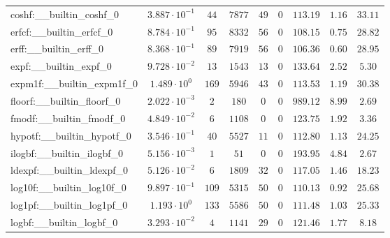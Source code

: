 \begin{tabular}{|l|c|c|c|c|c|c|c|c|}
coshf:\_\_builtin\_coshf\_0               & $ 3.887 \cdot 10^{-1} $ & $ 44     $ & $ 7877   $ & $ 49   $ & $ 0   $ & $ 113.19      $ & $ 1.16    $ & $ 33.11   $ \\
erfcf:\_\_builtin\_erfcf\_0               & $ 8.784 \cdot 10^{-1} $ & $ 95     $ & $ 8332   $ & $ 56   $ & $ 0   $ & $ 108.15      $ & $ 0.75    $ & $ 28.82   $ \\
erff:\_\_builtin\_erff\_0                 & $ 8.368 \cdot 10^{-1} $ & $ 89     $ & $ 7919   $ & $ 56   $ & $ 0   $ & $ 106.36      $ & $ 0.60    $ & $ 28.95   $ \\
expf:\_\_builtin\_expf\_0                 & $ 9.728 \cdot 10^{-2} $ & $ 13     $ & $ 1543   $ & $ 13   $ & $ 0   $ & $ 133.64      $ & $ 2.52    $ & $ 5.30    $ \\
expm1f:\_\_builtin\_expm1f\_0             & $ 1.489 \cdot 10^{0}  $ & $ 169    $ & $ 5946   $ & $ 43   $ & $ 0   $ & $ 113.53      $ & $ 1.19    $ & $ 30.38   $ \\
floorf:\_\_builtin\_floorf\_0             & $ 2.022 \cdot 10^{-3} $ & $ 2      $ & $ 180    $ & $ 0    $ & $ 0   $ & $ 989.12      $ & $ 8.99    $ & $ 2.69    $ \\
fmodf:\_\_builtin\_fmodf\_0               & $ 4.849 \cdot 10^{-2} $ & $ 6      $ & $ 1108   $ & $ 0    $ & $ 0   $ & $ 123.75      $ & $ 1.92    $ & $ 3.36    $ \\
hypotf:\_\_builtin\_hypotf\_0             & $ 3.546 \cdot 10^{-1} $ & $ 40     $ & $ 5527   $ & $ 11   $ & $ 0   $ & $ 112.80      $ & $ 1.13    $ & $ 24.25   $ \\
ilogbf:\_\_builtin\_ilogbf\_0             & $ 5.156 \cdot 10^{-3} $ & $ 1      $ & $ 51     $ & $ 0    $ & $ 0   $ & $ 193.95      $ & $ 4.84    $ & $ 2.67    $ \\
ldexpf:\_\_builtin\_ldexpf\_0             & $ 5.126 \cdot 10^{-2} $ & $ 6      $ & $ 1809   $ & $ 32   $ & $ 0   $ & $ 117.05      $ & $ 1.46    $ & $ 18.23   $ \\
log10f:\_\_builtin\_log10f\_0             & $ 9.897 \cdot 10^{-1} $ & $ 109    $ & $ 5315   $ & $ 50   $ & $ 0   $ & $ 110.13      $ & $ 0.92    $ & $ 25.68   $ \\
log1pf:\_\_builtin\_log1pf\_0             & $ 1.193 \cdot 10^{0}  $ & $ 133    $ & $ 5586   $ & $ 50   $ & $ 0   $ & $ 111.48      $ & $ 1.03    $ & $ 25.33   $ \\
logbf:\_\_builtin\_logbf\_0               & $ 3.293 \cdot 10^{-2} $ & $ 4      $ & $ 1141   $ & $ 29   $ & $ 0   $ & $ 121.46      $ & $ 1.77    $ & $ 8.18    $ \\

\end{tabular}
